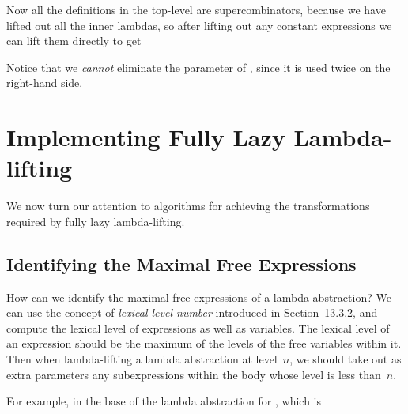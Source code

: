 Now all the definitions in the top-level  are supercombinators, because
we have lifted out all the inner lambdas, so after lifting out any constant
expressions we can lift them directly to get


\noindent
Notice that we \textit{cannot} eliminate the  parameter of , since it is used
twice on the right-hand side.

\section{Implementing Fully Lazy Lambda-lifting}

We now turn our attention to algorithms for achieving the transformations
required by fully lazy lambda-lifting.

\subsection{Identifying the Maximal Free Expressions}

How can we identify the maximal free expressions of a lambda abstraction?
We can use the concept of \textit{lexical level-number} introduced in Section~13.3.2,
and compute the lexical level of expressions as well as variables. The lexical
level of an expression should be the maximum of the levels of the free
variables within it. Then when lambda-lifting a lambda abstraction at level~$n$,
we should take out as extra parameters any subexpressions within the body
whose level is less than~$n$.

For example, in the base of the lambda abstraction for , which is

